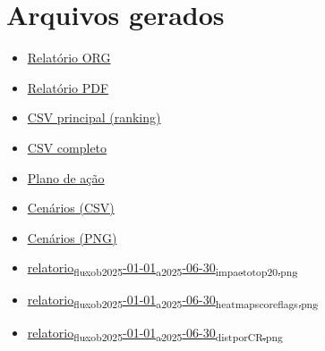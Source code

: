 \documentclass[11pt]{article}
\begin{document}
\section{Arquivos gerados}
\label{sec:org668ffcd}
\begin{itemize}
\item \href{file:///home/gustavodetarso/Documentos/atestmed-defender/graphs\_and\_tables/exports/relatorio\_fluxo\_b\_2025-01-01\_a\_2025-06-30.org}{Relatório ORG}
\item \href{file:///home/gustavodetarso/Documentos/atestmed-defender/graphs\_and\_tables/exports/pdf/relatorio\_fluxo\_b\_2025-01-01\_a\_2025-06-30.pdf}{Relatório PDF}
\item \href{file:///home/gustavodetarso/Documentos/atestmed-defender/graphs\_and\_tables/exports/relatorio\_fluxo\_b\_2025-01-01\_a\_2025-06-30.csv}{CSV principal (ranking)}
\item \href{file:///home/gustavodetarso/Documentos/atestmed-defender/graphs\_and\_tables/exports/relatorio\_fluxo\_b\_2025-01-01\_a\_2025-06-30\_FULL.csv}{CSV completo}
\item \href{file:///home/gustavodetarso/Documentos/atestmed-defender/graphs\_and\_tables/exports/relatorio\_fluxo\_b\_2025-01-01\_a\_2025-06-30\_plano\_acao.csv}{Plano de ação}
\item \href{file:///home/gustavodetarso/Documentos/atestmed-defender/graphs\_and\_tables/exports/relatorio\_fluxo\_b\_2025-01-01\_a\_2025-06-30\_cenarios\_mensais.csv}{Cenários (CSV)}
\item \href{file:///home/gustavodetarso/Documentos/atestmed-defender/graphs\_and\_tables/exports/relatorio\_fluxo\_b\_2025-01-01\_a\_2025-06-30\_cenarios\_mensais.png}{Cenários (PNG)}
\item \href{file:///home/gustavodetarso/Documentos/atestmed-defender/graphs\_and\_tables/exports/relatorio\_fluxo\_b\_2025-01-01\_a\_2025-06-30\_impacto\_top20.png}{relatorio\textsubscript{fluxo}\textsubscript{b}\textsubscript{2025}-01-01\textsubscript{a}\textsubscript{2025}-06-30\textsubscript{impacto}\textsubscript{top20.png}}
\item \href{file:///home/gustavodetarso/Documentos/atestmed-defender/graphs\_and\_tables/exports/relatorio\_fluxo\_b\_2025-01-01\_a\_2025-06-30\_heatmap\_score\_flags.png}{relatorio\textsubscript{fluxo}\textsubscript{b}\textsubscript{2025}-01-01\textsubscript{a}\textsubscript{2025}-06-30\textsubscript{heatmap}\textsubscript{score}\textsubscript{flags.png}}
\item \href{file:///home/gustavodetarso/Documentos/atestmed-defender/graphs\_and\_tables/exports/relatorio\_fluxo\_b\_2025-01-01\_a\_2025-06-30\_dist\_por\_CR.png}{relatorio\textsubscript{fluxo}\textsubscript{b}\textsubscript{2025}-01-01\textsubscript{a}\textsubscript{2025}-06-30\textsubscript{dist}\textsubscript{por}\textsubscript{CR.png}}

\end{itemize}
\end{document}
